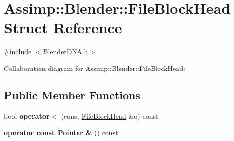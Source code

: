\hypertarget{struct_assimp_1_1_blender_1_1_file_block_head}{\section{Assimp\+:\+:Blender\+:\+:File\+Block\+Head Struct Reference}
\label{struct_assimp_1_1_blender_1_1_file_block_head}
}


{\ttfamily \#include $<$Blender\+D\+N\+A.\+h$>$}



Collaboration diagram for Assimp\+:\+:Blender\+:\+:File\+Block\+Head\+:
\subsection*{Public Member Functions}
\begin{DoxyCompactItemize}
\item 
\hypertarget{struct_assimp_1_1_blender_1_1_file_block_head_a38ec064237160b0ba165da98a93b5bd3}{bool {\bfseries operator$<$} (const \hyperlink{struct_assimp_1_1_blender_1_1_file_block_head}{File\+Block\+Head} \&o) const }\label{struct_assimp_1_1_blender_1_1_file_block_head_a38ec064237160b0ba165da98a93b5bd3}

\item 
\hypertarget{struct_assimp_1_1_blender_1_1_file_block_head_a5c7eae3d57374ddd36a5d35a0242926d}{{\bfseries operator const Pointer \&} () const }\label{struct_assimp_1_1_blender_1_1_file_block_head_a5c7eae3d57374ddd36a5d35a0242926d}

\end{DoxyCompactItemize}
